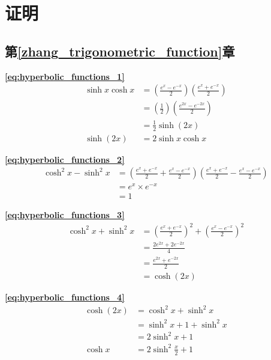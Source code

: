\section{证明}
\subsection{\centering 第\ref{zhang_trigonometric_function}章}
\textbf{\large \ref{eq:hyperbolic_functions_1}}
\begin{displaymath}
\begin{split}
\sinh x\cosh x &= \left(\frac{e^x-e^{-x}}{2}\right)\left(\frac{e^x+e^{-x}}{2}\right) \\
&=\left(\frac{1}{2}\right)\left(\frac{e^{2x}-e^{-2x}}{2}\right) \\
&= \frac{1}{2}\sinh (2x) \\
\sinh (2x) &= 2\sinh x\cosh x
\end{split}
\end{displaymath}

\textbf{\large \ref{eq:hyperbolic_functions_2}}
\begin{displaymath}
\begin{split}
\cosh^2x-\sinh^2x &=\left(\frac{e^x+e^{-x}}{2}+\frac{e^x-e^{-x}}{2}\right)\left(\frac{e^x+e^{-x}}{2}-\frac{e^x-e^{-x}}{2}\right) \\
&= e^x\times e^{-x} \\
&=1
\end{split}
\end{displaymath}

\textbf{\large \ref{eq:hyperbolic_functions_3}}
\begin{displaymath}
\begin{split}
\cosh^2x+\sinh^2x &=\left(\frac{e^x+e^{-x}}{2}\right)^2+\left(\frac{e^x-e^{-x}}{2}\right)^2 \\
&=\frac{2e^{2x}+2e^{-2x}}{4} \\
&=\frac{e^{2x}+e^{-2x}}{2} \\
&=\cosh (2x)
\end{split}
\end{displaymath}

\textbf{\large \ref{eq:hyperbolic_functions_4}}
\begin{displaymath}
\begin{split}
\cosh (2x)  &=\cosh^2x+\sinh^2x \\
&=\sinh^2x +1 +\sinh^2x \\
&=2\sinh^2x +1 \\
\cosh x &=2\sinh^2\frac{x}{2}+1
\end{split}
\end{displaymath}

